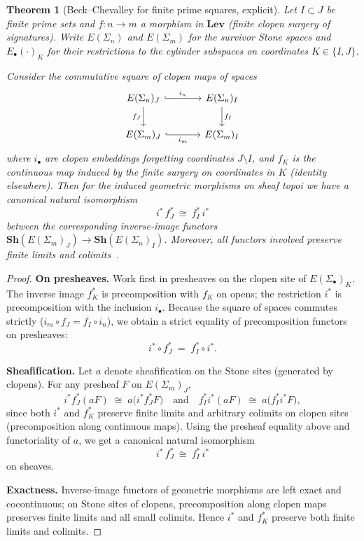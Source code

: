 \documentclass[12pt]{article}
\newtheorem{theorem}{Theorem}[section]
\numberwithin{equation}{section}
\begin{document}
\begin{theorem}[Beck--Chevalley for finite prime squares, explicit]\label{thm:beck-chev-full}
Let $I\subset J$ be finite prime sets and $f:n\to m$ a morphism in $\mathbf{Lev}$ (finite clopen surgery of signatures). Write $E(\Sigma_n)$ and $E(\Sigma_m)$ for the survivor Stone spaces and $E_\bullet(\cdot)_K$ for their restrictions to the cylinder subspaces on coordinates $K\in\{I,J\}$.

Consider the commutative square of clopen maps of spaces
\[
\begin{tikzcd}[column sep=3.6em, row sep=2.0em]
E(\Sigma_n)_J \arrow[r, hook, "i_{n}"] \arrow[d, "f_J"'] & E(\Sigma_n)_I \arrow[d, "f_I"] \\
E(\Sigma_m)_J \arrow[r, hook, "i_{m}"'] & E(\Sigma_m)_I
\end{tikzcd}
\]
where $i_{\bullet}$ are clopen embeddings forgetting coordinates $J\setminus I$, and $f_K$ is the continuous map induced by the finite surgery on coordinates in $K$ (identity elsewhere). Then for the induced geometric morphisms on sheaf topoi we have a canonical natural isomorphism
\[
i^{\ast}\, f_J^{\ast}\ \cong\ f_I^{\ast}\, i^{\ast}
\]
between the corresponding inverse-image functors $\mathbf{Sh}(E(\Sigma_m)_J)\to \mathbf{Sh}(E(\Sigma_n)_I)$. Moreover, all functors involved preserve finite limits and colimits~\cite{SpivackUGPFormalization,ugp-lean}.
\end{theorem}

\begin{proof}
\textbf{On presheaves.} Work first in presheaves on the clopen site of $E(\Sigma_\bullet)_K$. The inverse image $f_K^{\ast}$ is precomposition with $f_K$ on opens; the restriction $i^{\ast}$ is precomposition with the inclusion $i_\bullet$. Because the square of spaces commutes strictly ($i_m\circ f_J = f_I\circ i_n$), we obtain a strict equality of precomposition functors on presheaves:
\[
i^{\ast}\circ f_J^{\ast} \;=\; f_I^{\ast}\circ i^{\ast}.
\]

\textbf{Sheafification.} Let $a$ denote sheafification on the Stone sites (generated by clopens). For any presheaf $F$ on $E(\Sigma_m)_J$,
\[
i^{\ast} f_J^{\ast} (aF) \;\cong\; a\big( i^{\ast} f_J^{\ast} F \big)
\quad\text{and}\quad
f_I^{\ast} i^{\ast} (aF) \;\cong\; a\big( f_I^{\ast} i^{\ast} F \big),
\]
since both $i^{\ast}$ and $f_K^{\ast}$ preserve finite limits and arbitrary colimits on clopen sites (precomposition along continuous maps). Using the presheaf equality above and functoriality of $a$, we get a canonical natural isomorphism
\[
i^{\ast}\, f_J^{\ast} \ \cong\ f_I^{\ast}\, i^{\ast}
\]
on sheaves.

\textbf{Exactness.} Inverse-image functors of geometric morphisms are left exact and cocontinuous; on Stone sites of clopens, precomposition along clopen maps preserves finite limits and all small colimits. Hence $i^{\ast}$ and $f_K^{\ast}$ preserve both finite limits and colimits.
\end{proof}
\end{document}

